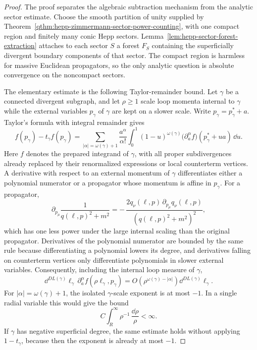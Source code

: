 \begin{proof}
The proof separates the algebraic subtraction mechanism from the analytic
sector estimate.  Choose the smooth partition of unity supplied by
Theorem~\ref{qthm:hepp-zimmermann-sector-power-counting}, with one compact
region and finitely many conic Hepp sectors.
Lemma~\ref{lem:hepp-sector-forest-extraction} attaches to each sector \(S\) a
forest \(F_S\) containing the superficially divergent boundary components of
that sector.  The compact region is harmless for massive Euclidean
propagators, so the only analytic question is absolute convergence on the
noncompact sectors.

The elementary estimate is the following Taylor-remainder bound.  Let
\(\gamma\) be a connected divergent subgraph, and let
\(\rho\ge1\) scale loop momenta internal to \(\gamma\) while the external
variables \(p_\gamma\) of \(\gamma\) are kept on a slower scale.  Write
\(p_\gamma=p_\gamma^\ast+a\).  Taylor's formula with integral remainder gives
\begin{equation}
  f(p_\gamma)-t_\gamma f(p_\gamma)
  =
  \sum_{|\alpha|=\omega(\gamma)+1}
  \frac{a^\alpha}{\alpha!}
  \int_0^1
    (1-u)^{\omega(\gamma)}
    \bigl(\partial_a^\alpha f\bigr)(p_\gamma^\ast+u a)\,\dd u .
  \label{eq:bphz-taylor-integral-remainder}
\end{equation}
Here \(f\) denotes the prepared integrand of \(\gamma\), with all proper
subdivergences already replaced by their renormalized expressions or local
counterterm vertices.  A derivative with respect to an external momentum of
\(\gamma\) differentiates either a polynomial numerator or a propagator whose
momentum is affine in \(p_\gamma\).  For a propagator,
\[
  \partial_{p_\mu}
  \frac{1}{q(\ell,p)^2+m^2}
  =
  -\,\frac{2q_\nu(\ell,p)\,\partial_{p_\mu}q_\nu(\ell,p)}
  {(q(\ell,p)^2+m^2)^2},
\]
which has one less power under the large internal scaling than the original
propagator.  Derivatives of the polynomial numerator are bounded by the same
rule because differentiating a polynomial lowers its degree, and derivatives
falling on counterterm vertices only differentiate polynomials in slower
external variables.  Consequently, including the internal loop measure of
\(\gamma\),
\begin{equation}
  \dd^{D L(\gamma)}\ell_\gamma\,
  \partial_a^\alpha f(\rho\ell_\gamma,p_\gamma)
  =
  O\!\left(\rho^{\omega(\gamma)-|\alpha|}\right)
  \dd^{D L(\gamma)}\ell_\gamma .
  \label{eq:bphz-derivative-lowers-degree}
\end{equation}
For \(|\alpha|=\omega(\gamma)+1\), the isolated \(\gamma\)-scale exponent is
at most \(-1\).  In a single radial variable this would give the bound
\begin{equation}
  C\int_R^\infty \rho^{-1}\,\frac{\dd\rho}{\rho}<\infty .
  \label{eq:bphz-one-boundary-integral}
\end{equation}
If \(\gamma\) has negative superficial degree, the same estimate holds without
applying \(1-t_\gamma\), because then the exponent is already at most \(-1\).


\end{proof}
